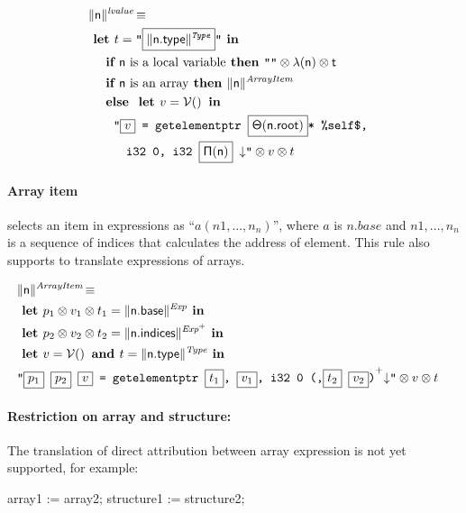 \documentclass[10pt,a4paper]{article}
\newcommand{\trad}[2]{\ensuremath{\lVert \textsf{#1} \rVert^{\textit{#2}}}}
\newcommand{\nl}[0]{\ensuremath{\downarrow}}
\DeclareMathOperator{\isdef}{\equiv}
\DeclareMathOperator{\variable}{\mathcal{V}()}
\newcommand{\llvm}[1]{\texttt{#1}}
\newcommand{\B}[1]{\textsf{#1}}
\newcommand{\ListOf}[1]{$\mbox{#1}^+$}
\newcommand{\IF}[0]{\textbf{ if }}
\newcommand{\ELSE}[0]{\textbf{ else }}
\newcommand{\THEN}[0]{\textbf{ then }}
\newcommand{\LET}[0]{\textbf{ let }}
\newcommand{\IN}[0]{\textbf{ in }}
\newcommand{\AND}[0]{\textbf{ and }}
\newcommand{\PH}[1]{\framebox{$#1$}}
\newcommand{\sep}[0]{\otimes}
\newcommand{\local}[0]{\ensuremath{\sf\lambda}}
\newcommand{\idx}[0]{\ensuremath{\sf\Pi}}
\newcommand{\state}[0]{\ensuremath{\sf\Theta}}
\begin{document}
\begin{align*}
\lefteqn{\trad{n}{lvalue} \isdef} \\
& \LET t = \llvm{"\PH{\trad{\B{n.type}}{Type}}"} \IN \\
& \quad \IF \mbox{\B{n} is a local variable} \THEN \llvm{""} \sep \local(\B{n}) \sep t \\
& \quad \IF \mbox{\B{n} is an array} \THEN  \trad{n}{ArrayItem} \\
& \quad \ELSE \LET v = \variable \IN \\
& \quad \quad \llvm{"\PH{v} = getelementptr \PH{\state(\B{n.root})}* \%self\$,} \\
& \quad \quad \quad \llvm{i32 0, i32 \PH{\idx(\B{n})} \nl"} \sep v \sep t
\end{align*}


\paragraph{Array item} selects an item in expressions as ``$a(n1,...,n_{n})$'', 
where $a$ is $n.base$ and $n1,...,n_{n}$ is a sequence of indices that 
calculates the address of element. This rule also supports to translate 
expressions of arrays.

\begin{align*}
\lefteqn{\trad{n}{ArrayItem} \isdef} \\
&  \LET p_1 \sep v_1 \sep t_1  = \trad{n.base}{Exp}  \IN \\
&  \LET p_2 \sep v_2 \sep t_2  = \trad{n.indices}{\ListOf{Exp}}  \IN \\
&  \LET v =  \variable \AND  t = \trad{\B{n.type}}{Type}  \IN \\
&  \llvm{"\PH{p_1} \PH{p_2} \PH{v} =  getelementptr \PH{t_1}, \PH{v_1}, i32 0 \ListOf{(,\PH{t_2} \PH{v_2})}\nl"}  \sep v \sep t\\
\end{align*}


\paragraph{Restriction on array and structure:} The translation of direct attribution
 between array expression is not yet supported, for example:

\begin{pascalcode}
 array1 := array2;
 structure1 := structure2;
\end{pascalcode}
\end{document}

